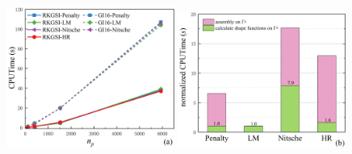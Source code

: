 \begin{figure}[H]
\centering
    \begin{subcaptiongroup}
    \includegraphics[width=0.49\textwidth]{figure/EHR/hole/cputime.png}
    \label{Hcputime}
    \includegraphics[width=0.49\textwidth]{figure/EHR/hole/efficiency.png}
    \label{Hefficiency}
\end{subcaptiongroup}
\caption{}
\end{figure} 
